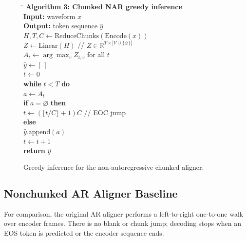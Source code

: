 \documentclass[conference]{IEEEtran}
\newcommand{\blank}{\varnothing}
\begin{document}
\begin{figure}[t]
\small
\begin{tabbing}
\hspace{0.03in}\=\hspace{0.20in}\=\hspace{0.20in}\=\kill
\textbf{Algorithm 3: Chunked NAR greedy inference}\\
\textbf{Input:} waveform $x$\\
\textbf{Output:} token sequence $\hat{y}$\\
$H,T,C \leftarrow \mathrm{ReduceChunks}(\mathrm{Encode}(x))$\\
$Z \leftarrow \mathrm{Linear}(H)$ \hfill // $Z \in \mathbb{R}^{T \times |\mathcal{V}\cup\{\blank\}|}$\\
$A_t \leftarrow \arg\max_v Z_{t,v}$ for all $t$\\
$\hat{y} \leftarrow [\,]$\\
$t \leftarrow 0$\\
\textbf{while} $t < T$ \textbf{do}\\
\> $a \leftarrow A_t$\\
\> \textbf{if} $a=\blank$ \textbf{then}\\
\>\> $t \leftarrow (\lfloor t/C \rfloor + 1)C$ \hfill // EOC jump\\
\> \textbf{else}\\
\>\> $\hat{y}.\mathrm{append}(a)$\\
\>\> $t \leftarrow t+1$\\
\textbf{return} $\hat{y}$
\end{tabbing}
\caption{Greedy inference for the non-autoregressive chunked aligner.}
\label{alg:chunked-nar}
\end{figure}

\subsection{Nonchunked AR Aligner Baseline}

For comparison, the original AR aligner performs a left-to-right one-to-one
walk over encoder frames. There is no blank or chunk jump; decoding stops when an
EOS token is predicted or the encoder sequence ends.
\end{document}
